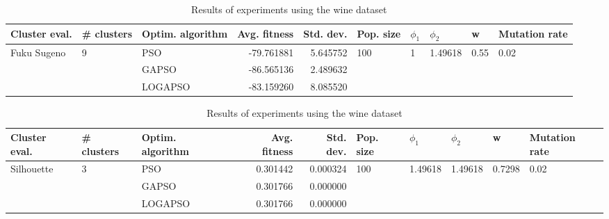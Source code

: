 \documentclass{article}
\begin{document}
\begin{table}
\centering
\caption{Results of experiments using the wine dataset}
\begin{tabular}{lllrrlllll}
\toprule
               Cluster eval. &        \# clusters & Optim. algorithm &  Avg. fitness &  Std. dev. &            Pop. size &         $\phi_{1}$ &               $\phi_{2}$ &                     w &         Mutation rate \\
\midrule
\multirow{3}{*}{Fuku Sugeno} & \multirow{3}{*}{9} &              PSO &    -79.761881 &   5.645752 & \multirow{3}{*}{100} & \multirow{3}{*}{1} & \multirow{3}{*}{1.49618} & \multirow{3}{*}{0.55} & \multirow{3}{*}{0.02} \\
                             &                    &            GAPSO &    -86.565136 &   2.489632 &                      &                    &                          &                       &                       \\
                             &                    &          LOGAPSO &    -83.159260 &   8.085520 &                      &                    &                          &                       &                       \\
\bottomrule
\end{tabular}
\end{table}
\begin{table}
\centering
\caption{Results of experiments using the wine dataset}
\begin{tabular}{lllrrlllll}
\toprule
              Cluster eval. &        \# clusters & Optim. algorithm &  Avg. fitness &  Std. dev. &            Pop. size &               $\phi_{1}$ &               $\phi_{2}$ &                       w &         Mutation rate \\
\midrule
\multirow{3}{*}{Silhouette} & \multirow{3}{*}{3} &              PSO &      0.301442 &   0.000324 & \multirow{3}{*}{100} & \multirow{3}{*}{1.49618} & \multirow{3}{*}{1.49618} & \multirow{3}{*}{0.7298} & \multirow{3}{*}{0.02} \\
                            &                    &            GAPSO &      0.301766 &   0.000000 &                      &                          &                          &                         &                       \\
                            &                    &          LOGAPSO &      0.301766 &   0.000000 &                      &                          &                          &                         &                       \\
\bottomrule
\end{tabular}
\end{table}
\end{document}
